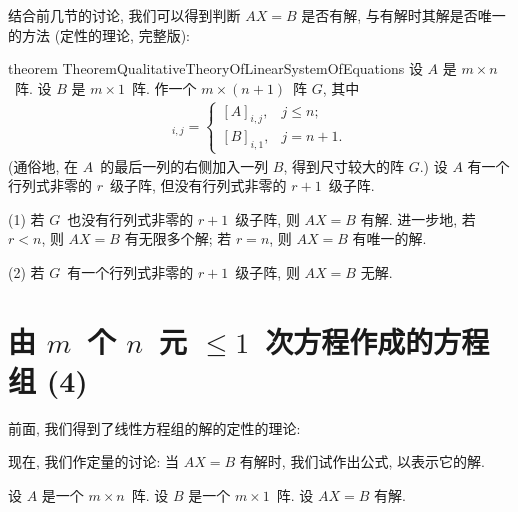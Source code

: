 结合前几节的讨论, 我们可以得到判断
\(AX = B\) 是否有解,
与有解时其解是否唯一的方法
(定性的理论, 完整版):

\begin{restatable}[]{theorem}%
    {TheoremQualitativeTheoryOfLinearSystemOfEquations}
    设 \(A\) 是 \(m \times n\)~阵.
    设 \(B\) 是 \(m \times 1\)~阵.
    作一个 \(m \times (n+1)\)~阵 \(G\),
    其中
    \begin{align*}
        [G]_{i,j}
        = \begin{cases}
              [A]_{i,j}, & j \leq n;  \\
              [B]_{i,1}, & j = n + 1.
          \end{cases}
    \end{align*}
    (通俗地, 在 \(A\)~的最后一列的右侧加入一列 \(B\),
    得到尺寸较大的阵 \(G\).)
    设
    \(A\) 有一个行列式非零的 \(r\)~级子阵,
    但没有行列式非零的 \(r+1\)~级子阵.

    (1)
    若 \(G\)~也没有行列式非零的 \(r+1\)~级子阵,
    则 \(AX = B\) 有解.
    进一步地, 若 \(r < n\),
    则 \(AX = B\) 有无限多个解;
    若 \(r = n\),
    则 \(AX = B\) 有唯一的解.

    (2)
    若 \(G\)~有一个行列式非零的 \(r+1\)~级子阵,
    则 \(AX = B\) 无解.
\end{restatable}

\section{\texorpdfstring{由 \(m\)~个 \(n\)~元
      \({\leq} 1\)~次方程作成的方程组 (4)}%
  {由 m 个 n 元 ≤1 次方程作成的方程组 (4)}}


\maldevigalegajxo

前面, 我们得到了线性方程组的解的定性的理论:

\TheoremQualitativeTheoryOfLinearSystemOfEquations*

现在, 我们作定量的讨论:
当 \(AX = B\) 有解时,
我们试作出公式, 以表示它的解.

设 \(A\) 是一个 \(m \times n\)~阵.
设 \(B\) 是一个 \(m \times 1\)~阵.
设 \(AX = B\) 有解.

